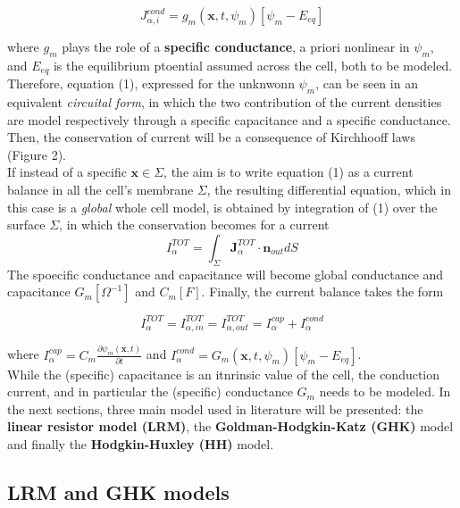 \documentclass[a4paper]{article}
\begin{document}
\begin{equation}
J^{cond}_{\alpha,i} = g_m(\textbf{x},t,\psi_m) [\psi_m - E_{eq}]
\end{equation}

where $g_m$ plays the role of a \textbf{specific conductance}, a priori nonlinear in $\psi_m$, and $E_{eq}$ is the equilibrium ptoential assumed across the cell, both to be modeled.\\
Therefore, equation (1), expressed for the unknwonn $\psi_m$, can be seen  in an equivalent \textit{circuital form}, in which the two contribution of the current densities are model respectively through a specific capacitance and a specific conductance. Then, the conservation of current will be a consequence of Kirchhooff laws (Figure 2).
\\


If instead of a specific $\textbf{x} \in \Sigma$, the aim is to write equation (1) as a current balance in all the cell's membrane $\Sigma$, the resulting differential equation, which in this case is a \textit{global} whole cell model, is obtained by integration of (1) over the surface $\Sigma$, in which the conservation becomes for a current $$ I_{\alpha}^{TOT} = \int_{\Sigma} \textbf{J}_{\alpha}^{TOT} \cdot \textbf{n}_{out} dS $$
The spoecific conductance and capacitance will become global conductance and  capacitance $ G_m [\Omega^{-1}]$ and $ C_m [F] $. Finally, the current balance takes the form

\begin{equation}
I_{\alpha}^{TOT} = I_{\alpha,in}^{TOT} =I_{\alpha,out}^{TOT} = I_{\alpha}^{cap} + I_{\alpha}^{cond}
\end{equation}

where $  I_{\alpha}^{cap} = C_m \frac{\partial \psi_m(\textbf{x},t)}{\partial t}$ and $ I_{\alpha}^{cond} = G_m(\textbf{x},t,\psi_m) [\psi_m - E_{eq}]$.\\
While the (specific) capacitance is an itnrinsic value of the cell, the conduction current, and  in particular the (specific) conductance $G_m$ needs to be modeled. In the next sections, three main model used in literature will be presented: the \textbf{linear resistor model (LRM)}, the \textbf{Goldman-Hodgkin-Katz (GHK)} model and finally the \textbf{Hodgkin-Huxley (HH)} model.



\subsection{LRM and GHK models}
\end{document}
